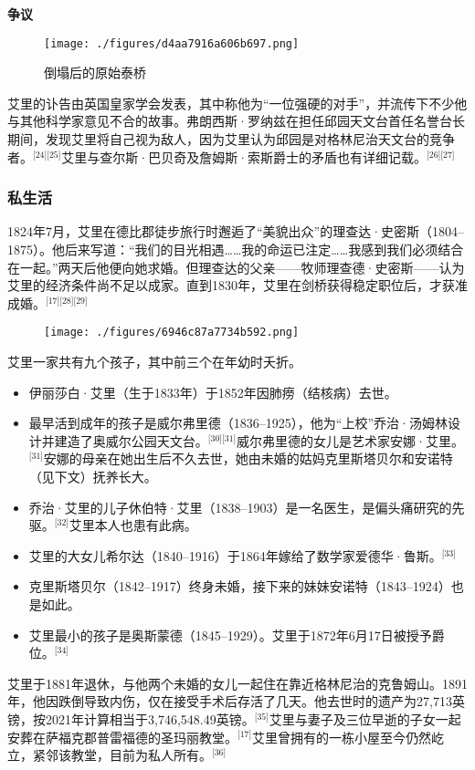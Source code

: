 \textbf{争议}
\begin{figure}[ht]
\centering
\texttt{[image: ./figures/d4aa7916a606b697.png]}
\caption{倒塌后的原始泰桥} \label{fig_AL_8}
\end{figure}
艾里的讣告由英国皇家学会发表，其中称他为“一位强硬的对手”，并流传下不少他与其他科学家意见不合的故事。弗朗西斯·罗纳兹在担任邱园天文台首任名誉台长期间，发现艾里将自己视为敌人，因为艾里认为邱园是对格林尼治天文台的竞争者。\(^\text{[24][25]}\)艾里与查尔斯·巴贝奇及詹姆斯·索斯爵士的矛盾也有详细记载。\(^\text{[26][27]}\)
\subsubsection{私生活}
1824年7月，艾里在德比郡徒步旅行时邂逅了“美貌出众”的理查达·史密斯（1804–1875）。他后来写道：“我们的目光相遇……我的命运已注定……我感到我们必须结合在一起。”两天后他便向她求婚。但理查达的父亲——牧师理查德·史密斯——认为艾里的经济条件尚不足以成家。直到1830年，艾里在剑桥获得稳定职位后，才获准成婚。\(^\text{[17][28][29]}\)
\begin{figure}[ht]
\centering
\texttt{[image: ./figures/6946c87a7734b592.png]}
\caption{} \label{fig_AL_9}
\end{figure}
艾里一家共有九个孩子，其中前三个在年幼时夭折。
\begin{itemize}
\item 伊丽莎白·艾里（生于1833年）于1852年因肺痨（结核病）去世。
\item 最早活到成年的孩子是威尔弗里德（1836–1925），他为“上校”乔治·汤姆林设计并建造了奥威尔公园天文台。\(^\text{[30][31]}\)威尔弗里德的女儿是艺术家安娜·艾里。\(^\text{[31]}\)安娜的母亲在她出生后不久去世，她由未婚的姑妈克里斯塔贝尔和安诺特（见下文）抚养长大。
\item 乔治·艾里的儿子休伯特·艾里（1838–1903）是一名医生，是偏头痛研究的先驱。\(^\text{[32]}\)艾里本人也患有此病。
\item 艾里的大女儿希尔达（1840–1916）于1864年嫁给了数学家爱德华·鲁斯。\(^\text{[33]}\)
\item 克里斯塔贝尔（1842–1917）终身未婚，接下来的妹妹安诺特（1843–1924）也是如此。
\item 艾里最小的孩子是奥斯蒙德（1845–1929）。艾里于1872年6月17日被授予爵位。\(^\text{[34]}\)
\end{itemize}
艾里于1881年退休，与他两个未婚的女儿一起住在靠近格林尼治的克鲁姆山。1891年，他因跌倒导致内伤，仅在接受手术后存活了几天。他去世时的遗产为27,713英镑，按2021年计算相当于3,746,548.49英镑。\(^\text{[35]}\)艾里与妻子及三位早逝的子女一起安葬在萨福克郡普雷福德的圣玛丽教堂。\(^\text{[17]}\)艾里曾拥有的一栋小屋至今仍然屹立，紧邻该教堂，目前为私人所有。\(^\text{[36]}\)

